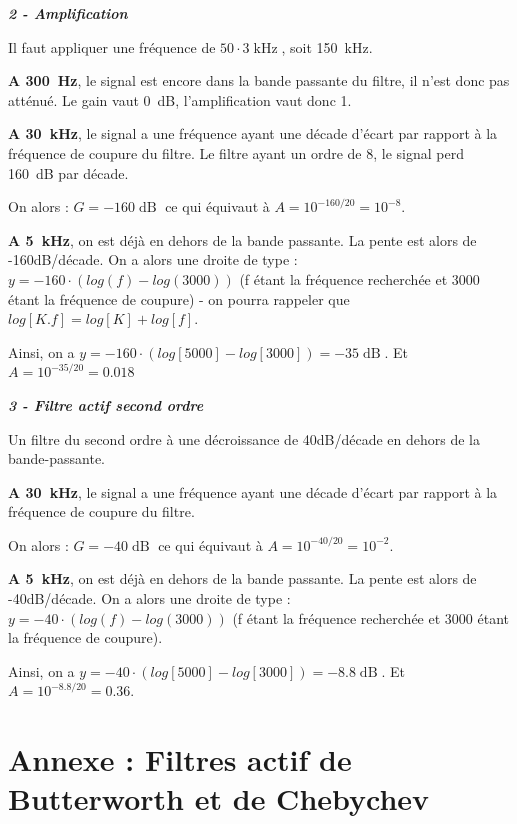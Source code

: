 \documentclass[a4paper,french]{paper}
\begin{document}
\textbf{\textit{2 - Amplification}}

Il faut appliquer une fréquence de $50 \cdot 3\operatorname{kHz}$, soit 150~kHz.

\medskip

\textbf{A 300~Hz}, le signal est encore dans la bande passante du filtre, il n'est donc pas atténué. Le gain vaut 0~dB, l'amplification vaut donc 1.
	
\medskip

\textbf{A 30~kHz}, le signal a une fréquence ayant une décade d'écart par rapport à la fréquence de coupure du filtre. Le filtre ayant un ordre de 8, le signal perd 160~dB par décade.

	On alors : $G = -160\operatorname{dB}$ ce qui équivaut à $A = 10^{-160/20} = 10^{-8}$.

\medskip
	
\textbf{A 5~kHz}, on est déjà en dehors de la bande passante. La pente est alors de -160dB/décade. On a alors une droite de type : $y = -160 \cdot (log(f) - log(3000))$ (f étant la fréquence recherchée et 3000 étant la fréquence 	de coupure) - on pourra rappeler que $log[K.f] = log[K] + log[f]$.

Ainsi, on a $y = -160 \cdot (log[5000] - log[3000]) = -35\operatorname{dB}$. Et $A = 10^{-35/20} = 0.018$ 


\textbf{\textit{3 - Filtre actif second ordre}}

	Un filtre du second ordre à une décroissance de 40dB/décade en dehors de la bande-passante.

\textbf{A 30~kHz}, le signal a une fréquence ayant une décade d'écart par rapport à la fréquence de coupure du filtre.

	On alors : $G = -40\operatorname{dB}$ ce qui équivaut à $A = 10^{-40/20} = 10^{-2}$.

\medskip
	
\textbf{A 5~kHz}, on est déjà en dehors de la bande passante. La pente est alors de -40dB/décade. On a alors une droite de type : $y = -40 \cdot (log(f) - log(3000))$ (f étant la fréquence recherchée et 3000 étant la fréquence 	de coupure).

Ainsi, on a $y = -40 \cdot (log[5000] - log[3000]) = -8.8\operatorname{dB}$. Et $A = 10^{-8.8/20} = 0.36$.





\newpage
\section*{Annexe : Filtres actif de \textbf{Butterworth} et de \textbf{Chebychev}}
\end{document}
